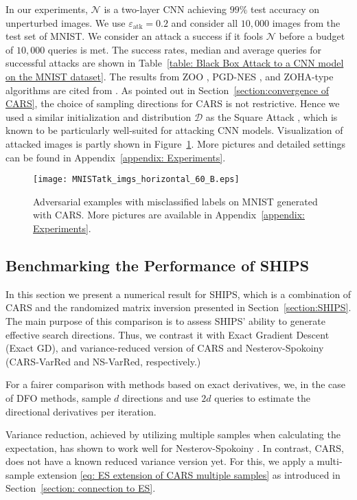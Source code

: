 In our experiments, $\mathcal{N}$ is a two-layer CNN achieving $99\%$ test accuracy on unperturbed images. We use $\varepsilon_{\mathrm{atk}} = 0.2$ and consider all $10,000$ images from the test set of MNIST. We consider an attack a success if it fools $\mathcal{N}$ before a budget of $10,000$ queries is met. The success rates, median and average queries for successful attacks are shown in Table~\ref{table: Black Box Attack to a CNN model on the MNIST dataset}.
The results from ZOO \cite{chen2017zoo}, PGD-NES \cite{ilyas2018black}, and ZOHA-type algorithms \cite{ye2018hessian} are cited from \cite{ye2018hessian}.
As pointed out in Section~\ref{section:convergence of CARS}, the choice of sampling directions for CARS is not restrictive. Hence we used a similar initialization and distribution $\mathcal{D}$ as the Square Attack \cite{andriushchenko2020square}, which is known to be particularly well-suited for attacking CNN models.
Visualization of attacked images is partly shown in Figure~\ref{fig:MNIST_ATK_RES}. More pictures and detailed settings can be found in Appendix~\ref{appendix: Experiments}.

\begin{figure}
    \centering
    \texttt{[image: MNISTatk\_imgs\_horizontal\_60\_B.eps]}
    \caption{Adversarial examples with misclassified labels on MNIST generated with CARS. More pictures are available in Appendix~\ref{appendix: Experiments}.}
    \label{fig:MNIST_ATK_RES}
\end{figure}

\subsection{Benchmarking the Performance of SHIPS}
In this section we present a numerical result for SHIPS, which is a combination of CARS and the randomized matrix inversion presented in Section~\ref{section:SHIPS}. The main purpose of this comparison is to assess SHIPS' ability to generate effective search directions. Thus, we contrast it with Exact Gradient Descent (Exact GD), and variance-reduced version of CARS and Nesterov-Spokoiny (CARS-VarRed and NS-VarRed, respectively.) 

For a fairer comparison with methods based on exact derivatives, we, in the case of DFO methods, sample $d$ directions and use $2d$ queries to estimate the directional derivatives per iteration.

Variance reduction, achieved by utilizing multiple samples when calculating the expectation, has shown to work well for Nesterov-Spokoiny \cite{salimans2017evolution,mania2018simple}.
In contrast, CARS, does not have a known reduced variance version yet. For this, we apply a multi-sample extension \eqref{eq: ES extension of CARS multiple samples} as introduced in Section~\ref{section: connection to ES}.

